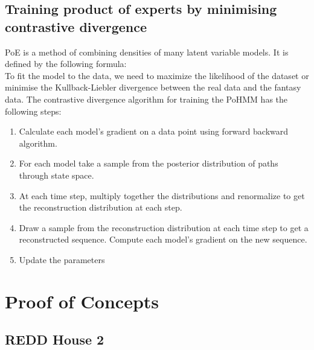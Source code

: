 \documentclass{sig-alternate}
\begin{document}
\subsection{Training product of experts by minimising contrastive divergence}
PoE is a method of combining densities of many latent variable models. It is defined by the following formula:\\
To fit the model to the data, we need to maximize the likelihood of the dataset or minimise the Kullback-Liebler divergence between the real data and the fantasy data. The contrastive divergence algorithm for training the PoHMM has the following steps:
\begin{enumerate}
\item Calculate each model's gradient on a data point using forward backward algorithm.
\item For each model take a sample from the posterior distribution of paths through state space.
\item At each time step, multiply together the distributions and renormalize to get the reconstruction distribution at each step.
\item Draw a sample from the reconstruction distribution at each time step to get a reconstructed sequence. Compute each model's gradient on the new sequence.
\item Update the parameters

\end{enumerate}

\section{Proof of Concepts}
\label{poc}

\subsection{REDD House 2}
\label{sec:redd}
\end{document}
